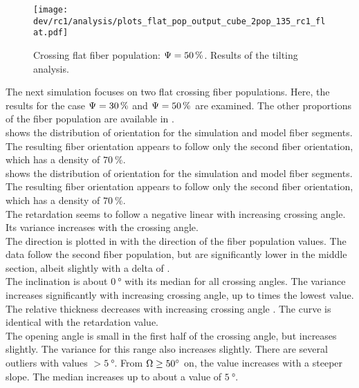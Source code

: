 %
\begin{figure}[!p]
\centering
\texttt{[image: dev/rc1/analysis/plots\_flat\_pop\_output\_cube\_2pop\_135\_rc1\_flat.pdf]}
\caption[]{Crossing flat fiber population: $\textnormal{$\Psi$}=\SI{50}{\percent}$. Results of the tilting analysis.}
\label{fig:flat_05_fiber_pop_rofl}
\end{figure}
%
The next simulation focuses on two flat crossing fiber populations.
Here, the results for the case $\textnormal{$\Psi$} = \SI{30}{\percent}$ and $\textnormal{$\Psi$} = \SI{50}{\percent}$ are examined.
The other proportions of the fiber population are available in \dummy[appendix]{}.
\\
%
 shows the distribution of orientation for the simulation and model fiber segments.
The resulting fiber orientation appears to follow only the second fiber orientation, which has a density of $\SI{70}{\percent}$.
\\
 shows the distribution of orientation for the simulation and model fiber segments.
The resulting fiber orientation appears to follow only the second fiber orientation, which has a density of $\SI{70}{\percent}$.
\\
The retardation seems to follow a negative linear \dummy{} with increasing crossing angle.
Its variance increases with the crossing angle.
\\
The direction is plotted in \dummy{} with the direction of the fiber population values.
The data follow the second fiber population, but are significantly lower in the middle section, albeit slightly with a delta of \dummy[value]{}.
\\
The inclination is about $\SI{0}{\degree}$ with its median for all crossing angles.
The variance increases significantly with increasing crossing angle, up to \dummy[3]{} times the lowest value.
\\
The relative thickness \trel{} decreases with increasing crossing angle \modelOmega{}.
The curve is identical with the retardation value.
\\
The opening angle is small in the first half of the crossing angle, but increases slightly.
The variance for this range also increases slightly.
There are several outliers with values $> \SI{5}{\degree}$.
From $\textnormal{$\Omega$} \ge \SI{50}{\degree}$ on, the value increases with a steeper slope.
The median increases up to about a value of $\SI{5}{\degree}$.
%
%
